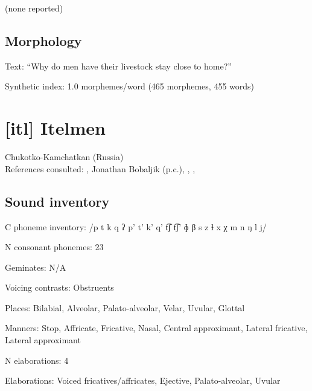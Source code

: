 {(none reported)
\subsection*{Morphology}

\begin{appendixdesc}

\item[Text:] “Why do men have their livestock stay close to home?” \citep[525--530]{Gerner2013}

\item[Synthetic index:] 1.0 morphemes/word (465 morphemes, 455 words)
\end{appendixdesc}
\section*{[itl] Itelmen}  %
Chukotko-Kamchatkan (Russia)\medskip\\
References consulted: \citet{Bobaljik2006}, Jonathan Bobaljik (p.c.), \citet{GeorgVolodin1999}, \citet{Volodin1976}, \citet{VolodinZhukova1968}
\subsection*{Sound inventory}
\begin{appendixdesc}

\item[C phoneme inventory:] /p t k q ʔ p’ t’ k’ q’ t͡ʃ t͡ʃ’ ɸ β s z ɬ x χ m n ŋ l j/

\item[N consonant phonemes:] 23

\item[Geminates:] N/A

\item[Voicing contrasts:] Obstruents

\item[Places:] Bilabial, Alveolar, Palato-alveolar, Velar, Uvular, Glottal

\item[Manners:] Stop, Affricate, Fricative, Nasal, Central approximant, Lateral fricative, Lateral approximant

\item[N elaborations:] 4

\item[Elaborations:] Voiced fricatives/affricates, Ejective, Palato-alveolar, Uvular


\end{appendixdesc}}
